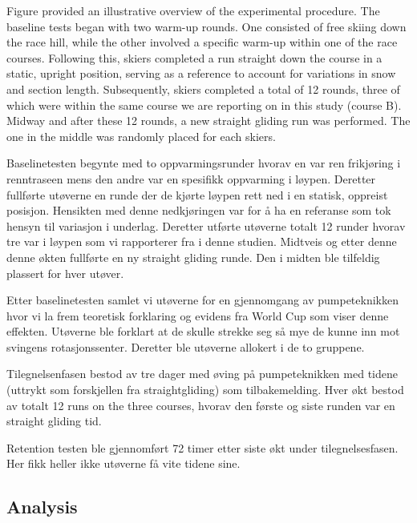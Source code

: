 \documentclass{article}
\begin{document}
Figure provided an illustrative overview of the experimental procedure. The baseline tests began with two warm-up rounds. One consisted of free skiing down the race hill, while the other involved a specific warm-up within one of the race courses. Following this, skiers completed a run straight down the course in a static, upright position, serving as a reference to account for variations in snow and section length. Subsequently, skiers completed a total of 12 rounds, three of which were within the same course we are reporting on in this study (course B). Midway and after these 12 rounds, a new straight gliding run was performed. The one in the middle was randomly placed for each skiers.

 






Baselinetesten begynte med to oppvarmingsrunder hvorav en var ren frikjøring i renntraseen mens den andre var en spesifikk oppvarming i løypen. Deretter fullførte utøverne en runde der de kjørte løypen rett ned i en statisk, oppreist posisjon. Hensikten med denne nedkjøringen var for å ha en referanse som tok hensyn til variasjon i underlag. Deretter utførte utøverne totalt 12 runder hvorav tre var i løypen som vi rapporterer fra i denne studien. Midtveis og etter denne denne økten fullførte en ny straight gliding runde. Den i midten ble tilfeldig plassert for hver utøver.

Etter baselinetesten samlet vi utøverne for en gjennomgang av pumpeteknikken hvor vi la frem teoretisk forklaring og evidens fra World Cup som viser denne effekten. Utøverne ble forklart at de skulle strekke seg så mye de kunne inn mot svingens rotasjonssenter. Deretter ble utøverne allokert i de to gruppene.

Tilegnelsenfasen bestod av tre dager med øving på pumpeteknikken med tidene (uttrykt som forskjellen fra straightgliding) som tilbakemelding. Hver økt bestod av totalt 12 runs on the three courses, hvorav den første og siste runden var en straight gliding tid. 

Retention testen ble gjennomført 72 timer etter siste økt under tilegnelsesfasen. Her fikk heller ikke utøverne få vite tidene sine. 



\subsection{Analysis}
\end{document}
